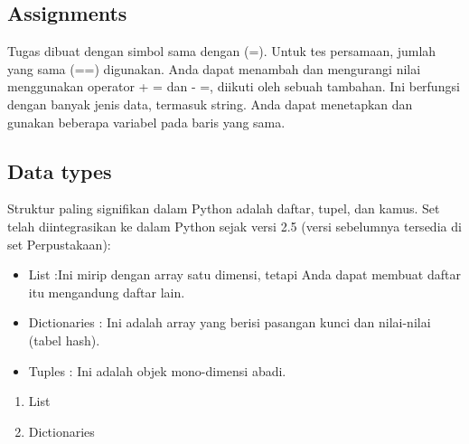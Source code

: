 \subsection{Assignments}
\hfill\break
Tugas dibuat dengan simbol sama dengan (=). Untuk tes persamaan, jumlah yang sama (==)
digunakan. Anda dapat menambah dan mengurangi nilai menggunakan operator + = dan - =, diikuti oleh
sebuah tambahan. Ini berfungsi dengan banyak jenis data, termasuk string. Anda dapat menetapkan dan
gunakan beberapa variabel pada baris yang sama.


\subsection{Data types}
\hfill\break
Struktur paling signifikan dalam Python adalah daftar, tupel, dan kamus. Set telah
diintegrasikan ke dalam Python sejak versi 2.5 (versi sebelumnya tersedia di set
Perpustakaan):
\begin{itemize}
    \item List :Ini mirip dengan array satu dimensi, tetapi Anda dapat membuat daftar itu
mengandung daftar lain.
    \item Dictionaries : Ini adalah array yang berisi pasangan kunci dan nilai-nilai (tabel hash).
    \item Tuples : Ini adalah objek mono-dimensi abadi.
\end{itemize}
\begin{enumerate}
\item List

\item Dictionaries

\end{enumerate}